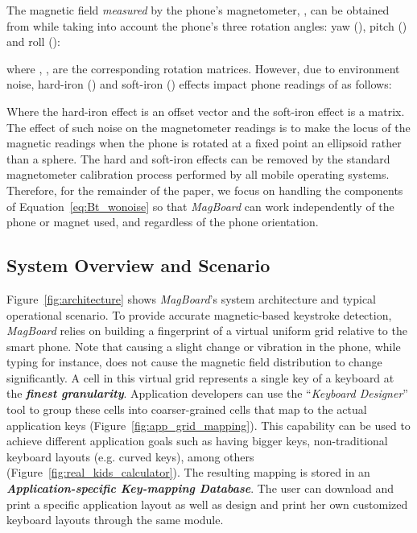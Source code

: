 \documentclass[conference]{IEEEtran}
\def \sys {\textit{MagBoard}}
\begin{document}
The magnetic field \emph{measured} by the phone's magnetometer, , can be obtained from  while taking into account the phone's three rotation angles: yaw (), pitch () and roll ():



where  , ,  are the corresponding rotation matrices. However, due to environment noise, hard-iron () and soft-iron () effects impact phone readings of  \cite{ozyagcilar2012calibrating} as follows: 



Where the hard-iron effect  is an offset vector and the soft-iron effect  is a matrix. The effect of such noise on the magnetometer readings is to make the locus of the magnetic readings when the phone is rotated at a fixed point an ellipsoid rather than a sphere. The hard and soft-iron effects can be removed by the standard magnetometer calibration process performed by all mobile operating systems. Therefore, for the remainder of the paper, we focus on handling the components of Equation~\ref{eq:Bt_wonoise} so that \sys{} can work independently of the phone or magnet used, and regardless of the phone orientation.

\subsection{System Overview and Scenario}

Figure~\ref{fig:architecture} shows \sys{}'s system architecture and typical operational scenario. To provide accurate magnetic-based keystroke detection, \sys{} relies on building a fingerprint of a virtual uniform grid relative to the smart phone. Note that causing a slight change or vibration in the phone, while typing for instance, does not cause the magnetic field distribution to change significantly. A cell in this virtual grid represents a single key of a keyboard at the \textbf{\emph{finest granularity}}. Application developers can use the ``\emph{Keyboard Designer}'' tool to group these cells into coarser-grained cells that map to the actual application keys (Figure~\ref{fig:app_grid_mapping}). This capability can be used to achieve different application goals such as having bigger keys, non-traditional keyboard layouts (e.g. curved keys), among others (Figure~\ref{fig:real_kids_calculator}). The resulting mapping is stored in an \textbf{\emph{Application-specific Key-mapping Database}}. The user can download and print a specific application layout as well as design and print her own customized keyboard layouts through the same module.
\end{document}
